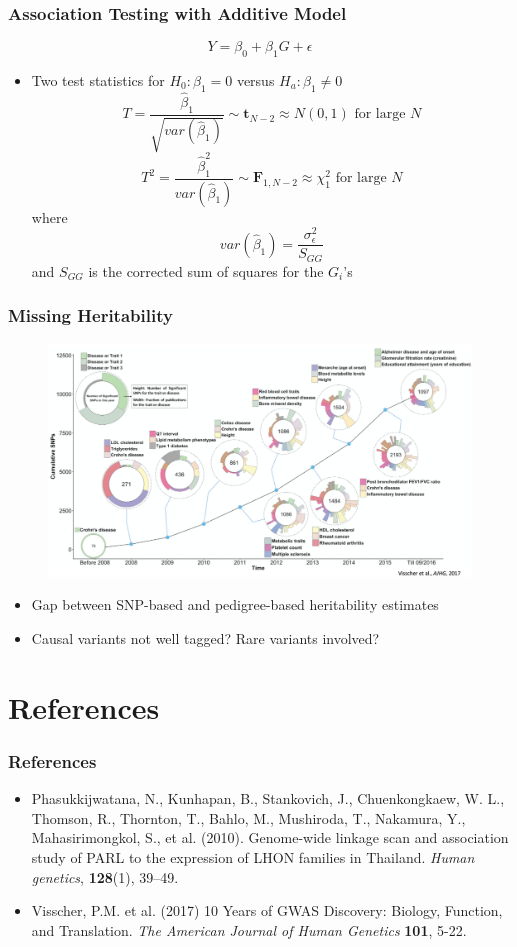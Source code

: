 \documentclass{beamer}
\begin{document}
\begin{frame}
	\frametitle{\bf Association Testing with Additive Model}
	\[ Y=\beta_{0} + \beta_{1}G + \epsilon \]
	\begin{itemize}
		\item Two test statistics for $H_0: \beta_{1}=0$ versus  $H_a: \beta_{1} \ne 0$ 
		\[T=\frac{\hat{\beta}_{1}}{\sqrt{var(\hat{\beta}_1)}} \sim \mathbf{t}_{N-2} \approx N(0,1) \mbox{ for large $N$}\]
		\[T^2=\frac{\hat{\beta}^2_{1}}{var(\hat{\beta}_1)} \sim \mathbf{F}_{1,N-2} \approx \chi^2_1\mbox{ for large $N$}\]
		where
		\[var(\hat{\beta}_1) =\frac{\sigma^2_{\epsilon}}{S_{GG}} \]
		and $S_{GG}$ is the corrected sum of squares for the $G_i$'s
	\end{itemize}
\end{frame}


\begin{frame}
	\frametitle{\bf Missing Heritability}	
	\vspace{-2em}
	\begin{figure}
		\centering
		\includegraphics[scale=.25]{Figures/gwas_discoveries}
	\end{figure}
	\begin{itemize}
		\item Gap between SNP-based and pedigree-based heritability estimates
		\item Causal variants not well tagged? Rare variants involved?
	\end{itemize}
\end{frame}

\section{References}

\begin{frame}
	\frametitle{\bf References}	
	\begin{itemize}
		\item Phasukkijwatana, N., Kunhapan, B., Stankovich, J., Chuenkongkaew, W. L., Thomson, R., Thornton, T., Bahlo, M., Mushiroda, T., Nakamura, Y., Mahasirimongkol, S., et al. (2010). Genome-wide linkage scan and association study of PARL to the expression of LHON families in Thailand. \textit{Human genetics}, \textbf{128}(1), 39–49.
		\item Visscher, P.M. et al.  (2017) 10 Years of GWAS Discovery: Biology, Function, and Translation. \textit{The American Journal of Human Genetics }\textbf{101}, 5-22.
	\end{itemize}
\end{frame}
\end{document}
